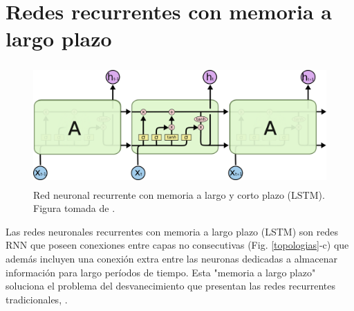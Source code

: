 
\section{Redes recurrentes con memoria a largo plazo}


\begin{figure}[h!]
  \begin{center}
    \includegraphics[height=1.8in]{Figures/LSTM3-chain.png}
    \caption{ Red neuronal recurrente con memoria a largo y corto plazo (LSTM). Figura tomada de \cite{olah}. }
    \label{LSTM}
  \end{center}
\end{figure}

Las redes neuronales recurrentes con memoria a largo plazo (LSTM) son redes RNN que poseen conexiones entre capas 
no consecutivas (Fig. \ref{topologias}-c) que además incluyen una conexión extra entre las neuronas dedicadas
 a almacenar información para largo períodos de tiempo. 
 Esta "memoria a largo plazo" soluciona el problema del desvanecimiento que presentan las redes recurrentes 
 tradicionales\cite{Kratzert}, \cite{olah}.


